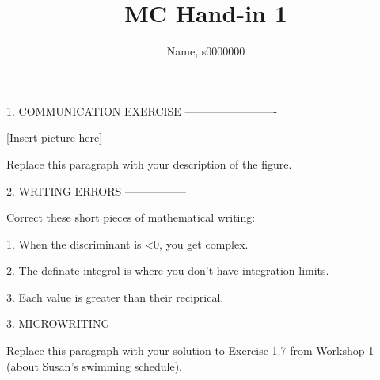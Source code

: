 \documentclass[a4paper,11pt]{article}
\title{MC Hand-in 1}
\author{Name, s0000000}
\begin{document}
\maketitle

1. COMMUNICATION EXERCISE
-------------------------

[Insert picture here]

Replace this paragraph with your description of the figure.


2. WRITING ERRORS
-----------------

Correct these short pieces of mathematical writing:

1. When the discriminant is <0, you get complex.

2. The definate integral is where you don't have integration limits.

3. Each value is greater than their reciprical.


3. MICROWRITING
----------------

Replace this paragraph with your solution to Exercise 1.7 from Workshop 1 (about Susan's swimming schedule).
\end{document}
